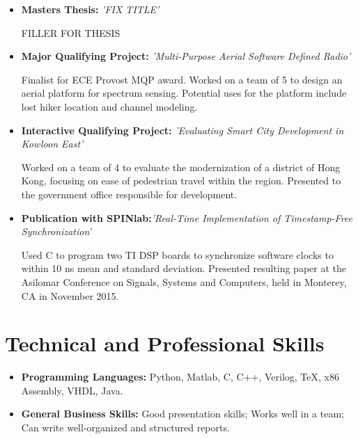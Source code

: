 \documentclass[11pt,a4paper,sans]{moderncv}        %
\begin{document}
\begin{itemize}[label={}]
\item{\textbf{Masters Thesis:} \textit{'FIX TITLE'}


\small{FILLER FOR THESIS }}

\item{\textbf{Major Qualifying Project:} \textit{'Multi-Purpose Aerial Software Defined Radio'}


\small{Finalist for ECE Provost MQP award. Worked on a team of 5 to design an aerial platform for spectrum sensing. Potential uses for the platform include lost hiker location and channel modeling. }}

\item{\textbf{Interactive Qualifying Project:} \textit{'Evaluating Smart City Development in Kowloon East'}


\small{Worked on a team of 4 to evaluate the modernization of a district of Hong Kong, focusing on ease of pedestrian travel within the region. Presented to the government office responsible for development.}}


\item{\textbf{Publication with SPINlab:}\textit{'Real-Time Implementation of Timestamp-Free Synchronization'}


\small{Used C to program two TI DSP boards to synchronize software clocks to within 10 ns mean and standard deviation. Presented resulting paper at the Asilomar Conference on Signals, Systems and Computers, held in Monterey, CA in November 2015.}}

\end{itemize}

\section{Technical and Professional Skills}

\vspace{3pt}

\begin{itemize}[label={}]

\item \textbf{Programming Languages: }Python, Matlab, C, C++, Verilog, TeX, x86 Assembly, VHDL, Java.
\vspace{3pt}

\item \textbf{General Business Skills:} Good presentation skills; Works well in a team; Can write well-organized and structured reports.

\end{itemize}
\end{document}
